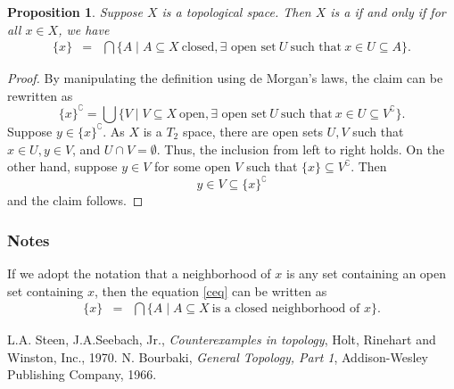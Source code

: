 \documentclass[12pt]{article}
\newtheorem{prop}{Proposition}
\begin{document}
\begin{prop}\cite{steen, bourbaki}
Suppose $X$ is a topological space. Then $X$ is a  if and only if
for all $x\in X$, we have
\begin{eqnarray}
\label{ceq}
  \{x\} &=& \bigcap \{A \mid A\subseteq X\ \mbox{closed}, \mbox{$\exists$ open set}\  U\ \mbox{such that}\ x\in U\subseteq A\}.
\end{eqnarray}
\end{prop}

\begin{proof}
By manipulating the definition using de Morgan's laws, the claim 
can be rewritten as 
$$
  \{x\}^\complement = \bigcup \{V \mid V\subseteq X\ \mbox{open}, \mbox{$\exists$ open set}\  U\ \mbox{such that}\ x\in U\subseteq V^\complement\}.
$$
Suppose $y\in \{x\}^\complement$. As $X$ is a $T_2$ space,
there are open sets $U,V$ such that $x\in U, y\in V$, and $U\cap V=\emptyset$. 
Thus, the inclusion from left to right holds. 
On the other hand, suppose $y\in V$ for some open $V$ such that 
$\{x\}\subseteq V^\complement$. Then 
$$
  y\in V\subseteq \{x\}^\complement
$$
and the claim follows.
\end{proof}

\subsubsection*{Notes}
If we adopt the notation that a neighborhood of $x$ 
is any set containing an open set containing $x$, then the equation \ref{ceq}
can be written as 
\begin{eqnarray*}
  \{x\} &=& \bigcap \{A \mid A\subseteq X\ \mbox{is a closed neighborhood of $x$} \}.
\end{eqnarray*}



\begin{thebibliography}{9}
 L.A. Steen, J.A.Seebach, Jr.,
\emph{Counterexamples in topology},
Holt, Rinehart and Winston, Inc., 1970.
 N. Bourbaki, \emph{General Topology, Part 1},
Addison-Wesley Publishing Company, 1966.
\end{thebibliography}
\end{document}
